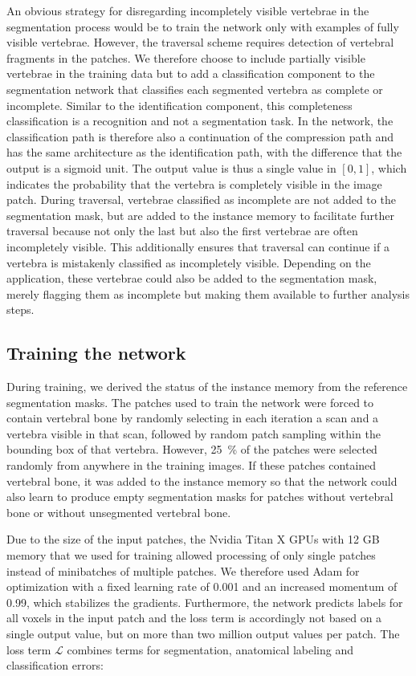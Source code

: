 \documentclass[authoryear,5p,final,times]{elsarticle}
\begin{document}
    An obvious strategy for disregarding incompletely visible vertebrae in the segmentation process would be to train the network only with examples of fully visible vertebrae. However, the traversal scheme requires detection of vertebral fragments in the patches. We therefore choose to include partially visible vertebrae in the training data but to add a classification component to the segmentation network that classifies each segmented vertebra as complete or incomplete. Similar to the identification component, this completeness classification is a recognition and not a segmentation task. In the network, the classification path is therefore also a continuation of the compression path and has the same architecture as the identification path, with the difference that the output is a sigmoid unit. The output value is thus a single value in $[0,1]$, which indicates the probability that the vertebra is completely visible in the image patch. During traversal, vertebrae classified as incomplete are not added to the segmentation mask, but are added to the instance memory to facilitate further traversal because not only the last but also the first vertebrae are often incompletely visible. This additionally ensures that traversal can continue if a vertebra is mistakenly classified as incompletely visible. Depending on the application, these vertebrae could also be added to the segmentation mask, merely flagging them as incomplete but making them available to further analysis steps.
    
    \subsection{Training the network}
    \label{sec:method_training}
    
    During training, we derived the status of the instance memory from the reference segmentation masks. The patches used to train the network were forced to contain vertebral bone by randomly selecting in each iteration a scan and a vertebra visible in that scan, followed by random patch sampling within the bounding box of that vertebra. However, \SI{25}{\percent} of the patches were selected randomly from anywhere in the training images. If these patches contained vertebral bone, it was added to the instance memory so that the network could also learn to produce empty segmentation masks for patches without vertebral bone or without unsegmented vertebral bone.
    
    Due to the size of the input patches, the Nvidia Titan X GPUs with 12 GB memory that we used for training allowed processing of only single patches instead of minibatches of multiple patches. We therefore used Adam \citep{Kingma2014} for optimization with a fixed learning rate of \num{0.001} and an increased momentum of \num{0.99}, which stabilizes the gradients. Furthermore, the network predicts labels for all voxels in the input patch and the loss term is accordingly not based on a single output value, but on more than two million output values per patch. The loss term $\mathcal{L}$ combines terms for segmentation, anatomical labeling and classification errors:
    
\end{document}
